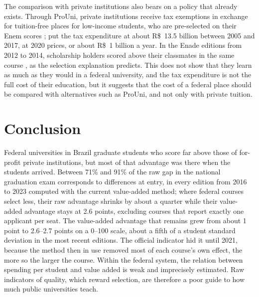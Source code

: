 \documentclass[12pt,letterpaper]{article}
\begin{document}
The comparison with private institutions also bears on a policy that already exists. Through ProUni, private institutions receive tax exemptions in exchange for tuition-free places for low-income students, who are pre-selected on their Enem scores \citep[art.~3]{lei11096}; \citet{almeida2022} put the tax expenditure at about R\$~13.5 billion between 2005 and 2017, at 2020 prices, or about R\$~1 billion a year. In the Enade editions from 2012 to 2014, scholarship holders scored above their classmates in the same course \citep{wainer2018}, as the selection explanation predicts. This does not show that they learn as much as they would in a federal university, and the tax expenditure is not the full cost of their education, but it suggests that the cost of a federal place should be compared with alternatives such as ProUni, and not only with private tuition.

\section{Conclusion}\label{sec:conclusion}

Federal universities in Brazil graduate students who score far above those of for-profit private institutions, but most of that advantage was there when the students arrived. Between 71\% and 91\% of the raw gap in the national graduation exam corresponds to differences at entry, in every edition from 2016 to 2023 computed with the current value-added method; where federal courses select less, their raw advantage shrinks by about a quarter while their value-added advantage stays at 2.6 points, excluding courses that report exactly one applicant per seat. The value-added advantage that remains grew from about 1 point to 2.6--2.7 points on a 0--100 scale, about a fifth of a student standard deviation in the most recent editions. The official indicator hid it until 2021, because the method then in use removed most of each course's own effect, the more so the larger the course. Within the federal system, the relation between spending per student and value added is weak and imprecisely estimated. Raw indicators of quality, which reward selection, are therefore a poor guide to how much public universities teach.
\end{document}
